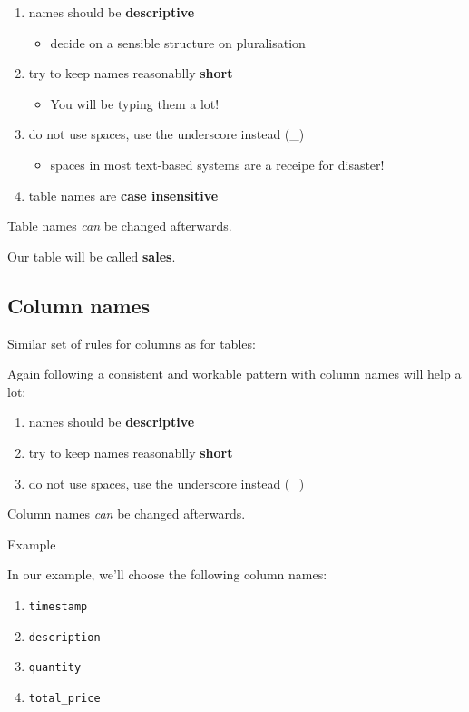 \documentclass[slides]{pgnotes}
\begin{document}
\begin{enumerate}
\item names should be \textbf{descriptive}
  \begin{itemize}
  \item decide on a sensible structure on pluralisation
  \end{itemize}
\item try to keep names reasonablly \textbf{short}
  \begin{itemize}
  \item You will be typing them a lot!
  \end{itemize}
\item do not use spaces, use the underscore instead (\_)
  \begin{itemize}
  \item spaces in most text-based systems are a receipe for disaster!
  \end{itemize}
\item table names are \textbf{case insensitive}
\end{enumerate}

Table names \textit{can} be changed afterwards.

Our table will be called \textbf{sales}.


\subsection{Column names}

Similar set of rules for columns as for tables:

Again following a consistent and workable pattern with column names will help a lot:

\begin{enumerate}
\item names should be \textbf{descriptive}
\item try to keep names reasonablly \textbf{short}
\item do not use spaces, use the underscore instead (\_)
\end{enumerate}

Column names \textit{can} be changed afterwards.

\newpage

\begin{greenbox}{Example}

  In our example, we'll choose the following column names:

  \begin{enumerate}
  \item \texttt{timestamp}
  \item \texttt{description}
  \item \texttt{quantity}
  \item \texttt{total\_price}
  \end{enumerate}

\end{greenbox}
\end{document}
